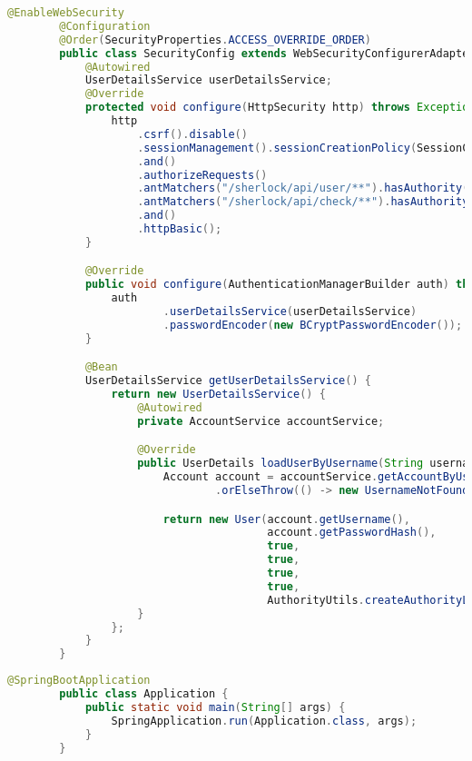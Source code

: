     \newpage
    \begin{lstlisting}[language=java]
        @EnableWebSecurity
        @Configuration
        @Order(SecurityProperties.ACCESS_OVERRIDE_ORDER)
        public class SecurityConfig extends WebSecurityConfigurerAdapter {
            @Autowired
            UserDetailsService userDetailsService;
            @Override
            protected void configure(HttpSecurity http) throws Exception {
                http
                    .csrf().disable()
                    .sessionManagement().sessionCreationPolicy(SessionCreationPolicy.STATELESS)
                    .and()
                    .authorizeRequests()
                    .antMatchers("/sherlock/api/user/**").hasAuthority(Role.ROLE_ADMIN.name())
                    .antMatchers("/sherlock/api/check/**").hasAuthority(Role.ROLE_USER.name())
                    .and()
                    .httpBasic();
            }

            @Override
            public void configure(AuthenticationManagerBuilder auth) throws Exception {
                auth
                        .userDetailsService(userDetailsService)
                        .passwordEncoder(new BCryptPasswordEncoder());
            }

            @Bean
            UserDetailsService getUserDetailsService() {
                return new UserDetailsService() {
                    @Autowired
                    private AccountService accountService;

                    @Override
                    public UserDetails loadUserByUsername(String username) throws UsernameNotFoundException {
                        Account account = accountService.getAccountByUsername(username)
                                .orElseThrow(() -> new UsernameNotFoundException(String.format("User with username=%s was not found", username)));

                        return new User(account.getUsername(),
                                        account.getPasswordHash(),
                                        true,
                                        true,
                                        true,
                                        true,
                                        AuthorityUtils.createAuthorityList(account.getRole().name()));
                    }
                };
            }
        }
    \end{lstlisting}    

    \newpage
    \begin{lstlisting}[language=java]
        @SpringBootApplication
        public class Application {
            public static void main(String[] args) {
                SpringApplication.run(Application.class, args);
            }
        }
    \end{lstlisting}
